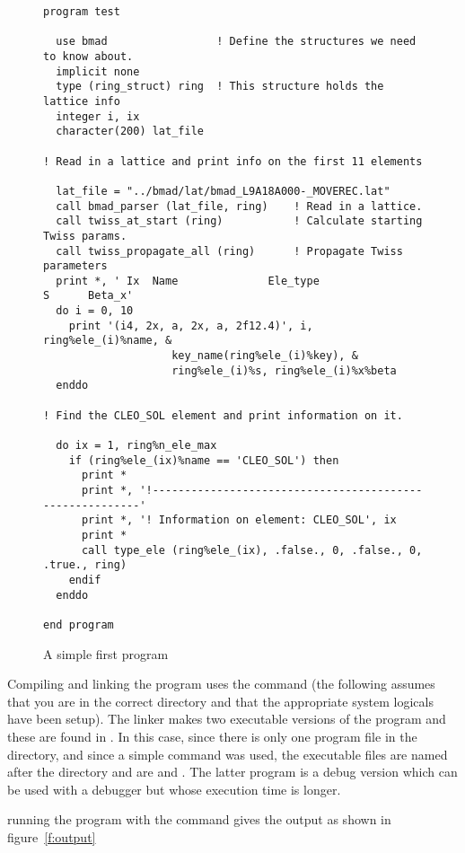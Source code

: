 \begin{figure}
\begin{verbatim}
program test

  use bmad                 ! Define the structures we need to know about.
  implicit none
  type (ring_struct) ring  ! This structure holds the lattice info
  integer i, ix
  character(200) lat_file

! Read in a lattice and print info on the first 11 elements

  lat_file = "../bmad/lat/bmad_L9A18A000-_MOVEREC.lat"
  call bmad_parser (lat_file, ring)    ! Read in a lattice.
  call twiss_at_start (ring)           ! Calculate starting Twiss params.
  call twiss_propagate_all (ring)      ! Propagate Twiss parameters
  print *, ' Ix  Name              Ele_type                   S      Beta_x'
  do i = 0, 10
    print '(i4, 2x, a, 2x, a, 2f12.4)', i, ring%ele_(i)%name, &
                    key_name(ring%ele_(i)%key), &
                    ring%ele_(i)%s, ring%ele_(i)%x%beta
  enddo

! Find the CLEO_SOL element and print information on it.

  do ix = 1, ring%n_ele_max
    if (ring%ele_(ix)%name == 'CLEO_SOL') then
      print *
      print *, '!---------------------------------------------------------'
      print *, '! Information on element: CLEO_SOL', ix
      print *
      call type_ele (ring%ele_(ix), .false., 0, .false., 0, .true., ring)
    endif
  enddo

end program
\end{verbatim}
\caption{A simple first program}
\label{f:program}
\end{figure}

Compiling and linking the program uses the  command (the
following assumes that you are in the correct directory and that the
appropriate system logicals have been setup). The linker makes two
executable versions of the program and these are found in .
In this case, since there is only one program file in the directory, and
since a simple  command was used, the executable files are
named after the directory and are  and
. The latter program is a debug version
which can be used with a debugger but whose execution time is longer.

running the program with the command 
gives the output as shown in figure~\ref{f:output}

